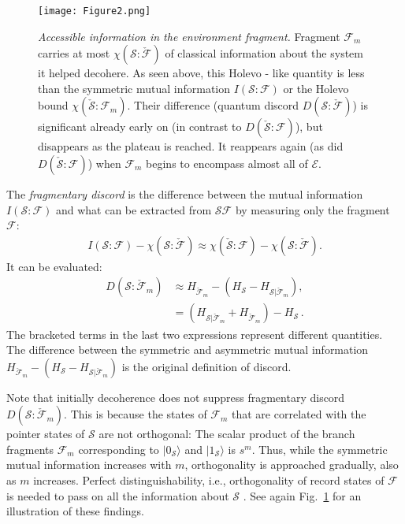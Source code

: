 \documentclass[aps,prl,showpacs,amsmath,amssymb,amsfonts,lengthcheck,twocolumn,longbibliography,superscriptaddress]{revtex4-2}
\newcommand{\ket}[1]    {| #1 \rangle}
\newcommand{\cS}        {{\mathcal S}}
\newcommand{\cE}        {{\mathcal E}}
\newcommand{\+}         {\dagger}
\newcommand\cF{{\mathcal F}}
\newcommand{\ba}{\begin{eqnarray}}
\newcommand{\ea}{\end{eqnarray}}
\newcommand{\mc}[1]{\mathcal{#1}}
\begin{document}
\begin{figure}
	\texttt{[image: Figure2.png]}
	\caption{\label{fig:D}{\it Accessible information in the environment fragment.} Fragment $\cF_m$ carries at most $\chi(\cS : \check \cF)$ of classical information about the system it helped decohere. As seen above, this Holevo - like quantity is less than the symmetric mutual information $I(\cS : \cF)$ or the Holevo bound $\chi(\check{\mc{S}}:\mc{F}_m)$. Their difference (quantum discord $D(\cS : \check \cF)$) is significant already early on (in contrast to $D(\check \cS :  \cF)$), but disappears as the plateau is reached. It reappears again (as did $D(\check \cS :  \cF)$) when $\cF_m$ begins to encompass almost all of $\cE$. }
\end{figure}

The \emph{fragmentary discord} is the difference between the mutual information $I({\mc{S}}:\mc{F})$ and what can be extracted from $\mc{SF}$ by measuring only the fragment $\cF$:
\ba
I({\mc{S}}:\mc{F})  - \chi (\cS: \check \cF) \approx \chi (\check \cS:\mc{F}) - \chi(\cS : \check \cF).
\ea  
It can be evaluated:
\begin{equation}
\begin{split}
D(\cS : \check \cF_m) &\approx H_{\check \cF_m} - \left( H_\cS - H_{\cS|{\check \cF_m}}\right),\\ 
& = \left(H_{\cS|{\check \cF_m}}+H_{\check \cF_m}\right)- H_\cS\, .
\end{split}
\end{equation}
The bracketed terms in the last two expressions represent different quantities. The difference between the symmetric and asymmetric mutual information  $H_{\check \cF_m} - \left( H_\cS - H_{\cS|{\check \cF_m}}\right)$ is the original definition of discord.

Note that initially decoherence does not suppress fragmentary discord $D(\cS : \check \cF_m)$. This is because the states of $\cF_m$ that are correlated with the pointer states of $\cS$ are not orthogonal: The scalar product of the branch fragments $\cF_m$ corresponding to $\ket {0_\cS}$ and $\ket {1_\cS}$ is $s^m$. Thus, while the symmetric mutual information increases with $m$, orthogonality is approached gradually, also as $m$ increases.  Perfect distinguishability, i.e., orthogonality of record states of $\cF$ is needed to pass on all the information about $\cS$ \cite{Z07a, Z13,Gardas2016PRA}. See again Fig.~\ref{fig:D} for an illustration of these findings.
\end{document}
